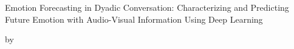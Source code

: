 \documentclass[
12pt, %
english, %
doublespacing, %
liststotoc, %
toctotoc, %
]{MastersDoctoralThesis} %
\author{Sadat Shahriar}
\begin{document}
\frontmatter %

\pagestyle{plain} %


\begin{titlepage}
\begin{center}

\vspace*{.06\textheight}



{\huge Emotion Forecasting in Dyadic Conversation: Characterizing and Predicting Future Emotion with Audio-Visual Information Using Deep Learning
 }\vspace{0.4cm} 
 \vfill
\begin{minipage}[t]{0.4\textwidth}
\begin{center}
\vspace{15pt}
\large{by}
\vspace{10ex}
\date{}
\end{center} \large
\end{minipage}

\vfill
\begin{minipage}[t]{0.4\textwidth}
\begin{center}
    


\large\authorname
\date{}
\end{center} \large
\end{minipage}
\begin{minipage}[t]{0.4\textwidth}
\end{minipage}\\[1cm]
 

\end{center}
\end{titlepage}
\end{document}

